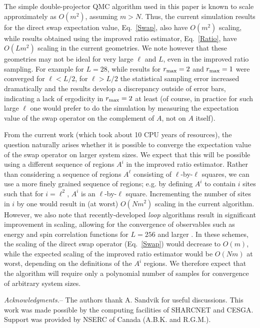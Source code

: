 \documentclass[prl,aps,twocolumn,floatfix,amsmath,amssymb,superscriptaddress,tightenlines]{revtex4}
\begin{document}
The simple double-projector QMC algorithm used in this paper is known to scale approximately as $O(m^2)$, \cite{AWSloop}
assuming $m >N$.
Thus, the current simulation results for the direct swap expectation
value, Eq.~\eqref{Swap}, also have
 $O(m^2)$ scaling, while results obtained using the improved ratio
estimator, Eq.~\eqref{Ratio}, have $O(Lm^2)$ scaling in the current geometries.
We note however that these geometries may not be ideal for very large $\ell$ and $L$, even in the improved ratio sampling.
For example for $L=28$, %
while results for $r_{\rm max}=2$ and $r_{\rm max}=1$ were converged for $\ell < L/2$, for $\ell>L/2$ the
statistical sampling error increased dramatically and the results develop a discrepancy outside of error bars, indicating a lack of ergodicity
in $r_{\rm max}=2$ at least (of course, in practice for such large $\ell$ one would prefer to do the simulation by measuring the 
expectation value of the swap operator on the complement of $A$, not on $A$ itself).

From the current work (which took about 10 CPU years of resources), 
the question naturally arises whether it is possible to converge the expectation value of the swap operator on
larger system sizes.  %
We expect that this will be possible using a different
sequence of regions $A^i$ in the improved ratio estimator.
Rather than considering a sequence of regions $A^{\ell}$ consisting of $\ell$-by-$\ell$ squares, 
we can use a more finely grained sequence of regions; e.g. by defining $A^i$ to contain
$i$ sites such that for $i=\ell^2$, $A^i$ is an $\ell$-by-$\ell$ square.  Incrementing the number of sites in $i$ by one would result in
(at worst) $O(Nm^2)$ scaling in the current algorithm.  
However, we also note that recently-developed {\it loop} algorithms
result in significant improvement in scaling, allowing for the convergence of observables such as energy and spin correlation functions for $L=256$ and larger \cite{AWSloop}.  In these schemes, the scaling of the direct swap operator (Eq.~\eqref{Swap}) 
would decrease to $O(m)$, while the expected scaling of the improved ratio estimator would be $O(Nm)$ at worst, depending
on the definitions of the $A^i$ regions.
We therefore expect that
the algorithm will require only a polynomial number of samples for convergence of arbitrary system sizes.


{\it Acknowledgments.}-- The authors thank A. Sandvik for useful discussions.
This work was made possible by the
computing facilities of SHARCNET and CESGA.  Support was provided by NSERC
of Canada (A.B.K. and R.G.M.).


\end{document}
